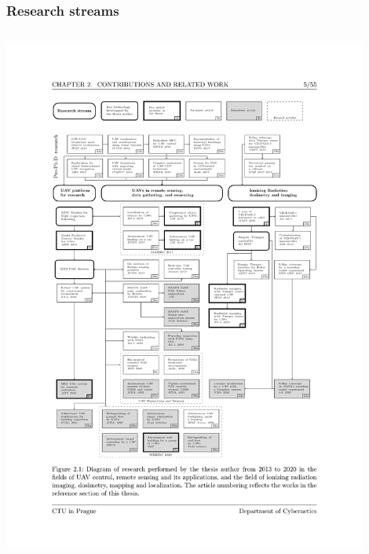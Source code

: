 \documentclass[aspectratio=169]{beamer}
\begin{document}


\begin{frame}
\frametitle{Research streams}

\begin{columns}[c]


\centering

\includegraphics[width=0.9\textwidth,trim={2.0cm 5.0cm 2.5cm 5.2cm},clip]{./fig/pubgraph_january.pdf}

\centering



\end{columns}
\end{frame}
\end{document}
